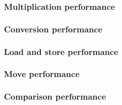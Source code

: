 \subsubsection{Multiplication performance}

\subsubsection{Conversion performance}

\subsubsection{Load and store performance}

\subsubsection{Move performance}

\subsubsection{Comparison performance}